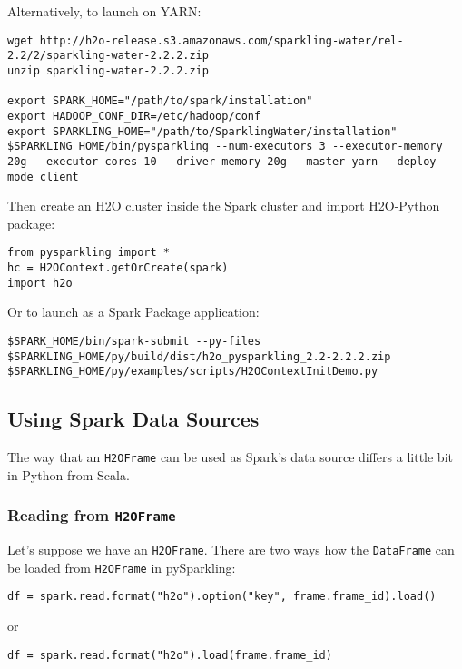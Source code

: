Alternatively, to launch on YARN:

\begin{lstlisting}[style=Bash]
wget http://h2o-release.s3.amazonaws.com/sparkling-water/rel-2.2/2/sparkling-water-2.2.2.zip
unzip sparkling-water-2.2.2.zip
 
export SPARK_HOME="/path/to/spark/installation"
export HADOOP_CONF_DIR=/etc/hadoop/conf
export SPARKLING_HOME="/path/to/SparklingWater/installation"
$SPARKLING_HOME/bin/pysparkling --num-executors 3 --executor-memory 20g --executor-cores 10 --driver-memory 20g --master yarn --deploy-mode client
\end{lstlisting}
    
Then create an H2O cluster inside the Spark cluster and import H2O-Python package:
\begin{lstlisting}[style=Python]
from pysparkling import *
hc = H2OContext.getOrCreate(spark)
import h2o
\end{lstlisting}

Or to launch as a Spark Package application:
\begin{lstlisting}[style=Bash]
$SPARK_HOME/bin/spark-submit --py-files $SPARKLING_HOME/py/build/dist/h2o_pysparkling_2.2-2.2.2.zip
$SPARKLING_HOME/py/examples/scripts/H2OContextInitDemo.py
\end{lstlisting}


\subsection{Using Spark Data Sources}

The way that an \texttt{H2OFrame} can be used as Spark's data source differs a little bit in Python from Scala.

\subsubsection{Reading from \texttt{H2OFrame}}

Let's suppose we have an \texttt{H2OFrame}. There are two ways how the \texttt{DataFrame} can be loaded from \texttt{H2OFrame} in pySparkling:
\begin{lstlisting}[style=Scala]
df = spark.read.format("h2o").option("key", frame.frame_id).load()
\end{lstlisting}
or
\begin{lstlisting}[style=Scala]
df = spark.read.format("h2o").load(frame.frame_id)
\end{lstlisting}

